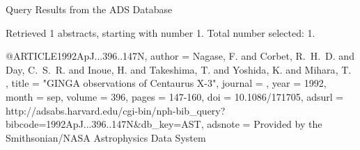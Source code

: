 Query Results from the ADS Database


Retrieved 1 abstracts, starting with number 1.  Total number selected: 1.

@ARTICLE{1992ApJ...396..147N,
   author = {{Nagase}, F. and {Corbet}, R.~H.~D. and {Day}, C.~S.~R. and 
	{Inoue}, H. and {Takeshima}, T. and {Yoshida}, K. and {Mihara}, T.
	},
    title = "{GINGA observations of Centaurus X-3}",
  journal = {\apj},
     year = 1992,
    month = sep,
   volume = 396,
    pages = {147-160},
      doi = {10.1086/171705},
   adsurl = {http://adsabs.harvard.edu/cgi-bin/nph-bib_query?bibcode=1992ApJ...396..147N&db_key=AST},
  adsnote = {Provided by the Smithsonian/NASA Astrophysics Data System}
}


